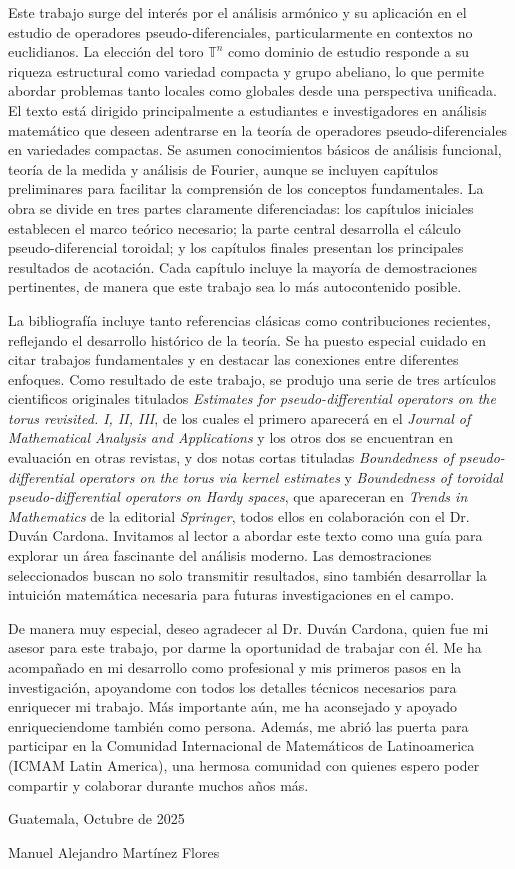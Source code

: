 
Este trabajo surge del interés por el análisis armónico y su aplicación en el estudio de operadores pseudo-diferenciales, particularmente en contextos no euclidianos. La elección del toro $\mathbb{T}^n$ como dominio de estudio responde a su riqueza estructural como variedad compacta y grupo abeliano, lo que permite abordar problemas tanto locales como globales desde una perspectiva unificada. El texto está dirigido principalmente a estudiantes e investigadores en análisis matemático que deseen adentrarse en la teoría de operadores pseudo-diferenciales en variedades compactas. Se asumen conocimientos básicos de análisis funcional, teoría de la medida y análisis de Fourier, aunque se incluyen capítulos preliminares para facilitar la comprensión de los conceptos fundamentales. La obra se divide en tres partes claramente diferenciadas: los capítulos iniciales establecen el marco teórico necesario; la parte central desarrolla el cálculo pseudo-diferencial toroidal; y los capítulos finales presentan los principales resultados de acotación. Cada capítulo incluye la mayoría de demostraciones pertinentes, de manera que este trabajo sea lo más autocontenido posible.


La bibliografía incluye tanto referencias clásicas como contribuciones recientes, reflejando el desarrollo histórico de la teoría. Se ha puesto especial cuidado en citar trabajos fundamentales y en destacar las conexiones entre diferentes enfoques. Como resultado de este trabajo, se produjo una serie de tres artículos cientificos originales titulados \textit{Estimates for pseudo-differential operators on the torus revisited. I, II, III}, de los cuales el primero aparecerá en el \textit{Journal of Mathematical Analysis and Applications} y los otros dos se encuentran en evaluación en otras revistas, y dos notas cortas tituladas \textit{Boundedness of pseudo-differential operators on the torus via kernel estimates} y \textit{Boundedness of toroidal pseudo-differential operators on Hardy spaces}, que apareceran en \textit{Trends in Mathematics} de la editorial \textit{Springer}, todos ellos en colaboración con el Dr. Duván Cardona. Invitamos al lector a abordar este texto como una guía para explorar un área fascinante del análisis moderno. Las demostraciones seleccionados buscan no solo transmitir resultados, sino también desarrollar la intuición matemática necesaria para futuras investigaciones en el campo.


De manera muy especial, deseo agradecer al Dr. Duván Cardona, quien fue mi asesor para este trabajo, por darme la oportunidad de trabajar con él. Me ha acompañado en mi desarrollo como profesional y mis primeros pasos en la investigación, apoyandome con todos los detalles técnicos necesarios para enriquecer mi trabajo. Más importante aún, me ha aconsejado y apoyado enriqueciendome también como persona. Además, me abrió las puerta para participar en la Comunidad Internacional de Matemáticos de Latinoamerica (ICMAM Latin America), una hermosa comunidad con quienes espero poder compartir y colaborar durante muchos años más. 

Guatemala, Octubre de 2025

Manuel Alejandro Martínez Flores